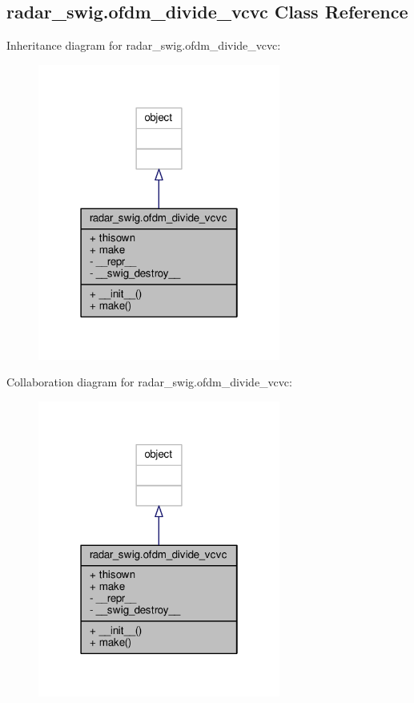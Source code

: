 \subsection{radar\+\_\+swig.\+ofdm\+\_\+divide\+\_\+vcvc Class Reference}
\label{classradar__swig_1_1ofdm__divide__vcvc}


Inheritance diagram for radar\+\_\+swig.\+ofdm\+\_\+divide\+\_\+vcvc\+:
\nopagebreak
\begin{figure}[H]
\begin{center}
\leavevmode
\includegraphics[width=226pt]{d4/d69/classradar__swig_1_1ofdm__divide__vcvc__inherit__graph}
\end{center}
\end{figure}


Collaboration diagram for radar\+\_\+swig.\+ofdm\+\_\+divide\+\_\+vcvc\+:
\nopagebreak
\begin{figure}[H]
\begin{center}
\leavevmode
\includegraphics[width=226pt]{de/dc4/classradar__swig_1_1ofdm__divide__vcvc__coll__graph}
\end{center}
\end{figure}
